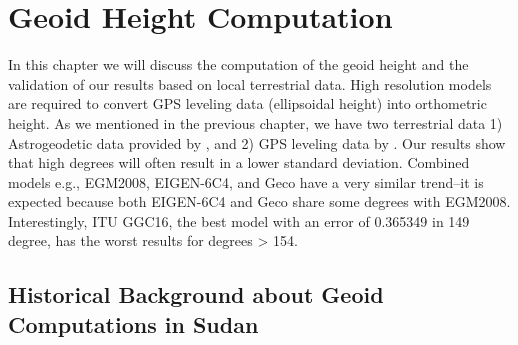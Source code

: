 \chapter{Geoid Height Computation}

In this chapter we will discuss the computation of the geoid height and the validation of our results based on local terrestrial data. High resolution models are required to convert GPS leveling data (ellipsoidal height) into orthometric height. As we mentioned in the previous chapter, we have two terrestrial data 1) Astrogeodetic data provided by \cite{osman}, and 2) GPS leveling data by \cite{ahmed_data}. Our results show that high degrees will often result in a lower standard deviation. Combined models e.g., EGM2008, EIGEN-6C4, and Geco have a very similar trend--it is expected because both EIGEN-6C4 and Geco share some degrees with EGM2008. Interestingly, ITU GGC16, the best model with an error of 0.365349 in 149 degree, has the worst results for degrees > 154.

\section{Historical Background about Geoid Computations in Sudan}


